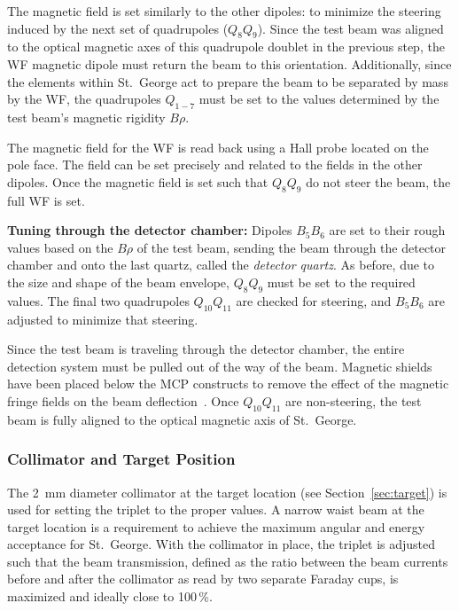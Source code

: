 The magnetic field is set similarly to the other dipoles: to minimize the
steering induced by the next set of quadrupoles ($Q_8Q_9$). Since the test beam
was aligned to the optical magnetic axes of this quadrupole doublet in the
previous step, the WF magnetic dipole must return the beam to this
orientation. Additionally, since the elements within St.\ George act to
prepare the beam to be separated by mass by the WF, the quadrupoles
$Q_{1-7}$ must be set to the values determined by the test beam's magnetic
rigidity $B\rho$.

The magnetic field for the WF is read back using a Hall probe located
on the pole face. The field can be set precisely and related to the fields in
the other dipoles. Once the magnetic field is set such that $Q_8Q_9$ do not
steer the beam, the full WF is set.

\textbf{Tuning through the detector chamber:}
Dipoles $B_5B_6$ are set to their rough values based on the $B\rho$ of the test
beam, sending the beam through the detector chamber and onto the last quartz,
called the \emph{detector quartz}. As before, due to the size and shape of the
beam envelope, $Q_8Q_9$ must be set to the required values. The final two
quadrupoles $Q_{10}Q_{11}$ are checked for steering, and $B_5B_6$ are adjusted
to minimize that steering.

Since the test beam is traveling through the detector chamber, the entire
detection system must be pulled out of the way of the beam. Magnetic shields
have been placed below the MCP constructs to remove the effect of the magnetic
fringe fields on the beam deflection~\cite{MoralesDNP}. Once $Q_{10}Q_{11}$ are
non-steering, the test beam is fully aligned to the optical magnetic axis of
St.\ George.

\subsubsection{Collimator and Target Position}

The 2~mm diameter collimator at the target location
(see Section~\ref{sec:target}) is
used for setting the triplet to the proper values. A narrow waist beam at the
target location is a requirement to achieve the maximum angular and energy
acceptance
for St.\ George. With the collimator in place, the triplet is adjusted such
that the beam transmission, defined as the ratio between the beam currents
before and after the collimator as read by two separate Faraday cups, is
maximized and ideally close to 100\,\%.


